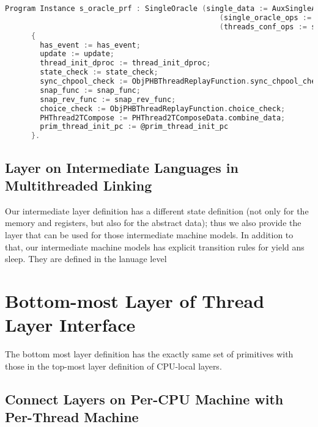 \begin{lstlisting}[language=C]
    Program Instance s_oracle_prf : SingleOracle (single_data := AuxSingleAbstractDataType.single_data) 
                                                 (single_oracle_ops := s_oracle_ops) 
                                                 (threads_conf_ops := s_threads_ops):=
      { 
        has_event := has_event;
        update := update;
        thread_init_dproc := thread_init_dproc;
        state_check := state_check;
        sync_chpool_check := ObjPHBThreadReplayFunction.sync_chpool_check;
        snap_func := snap_func;
        snap_rev_func := snap_rev_func;
        choice_check := ObjPHBThreadReplayFunction.choice_check;
        PHThread2TCompose := PHThread2TComposeData.combine_data;
        prim_thread_init_pc := @prim_thread_init_pc
      }.
\end{lstlisting}

\subsection{Layer on Intermediate Languages in Multithreaded Linking}
\label{chapter:certikos:subsec:layer-on-intermediate-languages-in-multithreaded-linking}

Our intermediate layer definition has a different state definition (not only for the memory and registers, but also for the abstract data); thus we also provide the 
layer that can be used for those intermediate machine models. 
In addition to that, our intermediate machine models has explicit 
transition rules for yield ans sleep. 
They are defined in the lanuage level 


\section{Bottom-most Layer of Thread Layer Interface}
\label{chapter:certikos:subsec:phthread}

The bottom most layer definition has the exactly same set of primitives with those in 
the top-most layer definition of CPU-local layers. 



\subsection{Connect Layers on Per-CPU Machine with Per-Thread Machine}
\label{chapter:certikos:subsec:multithreaded-connect}


